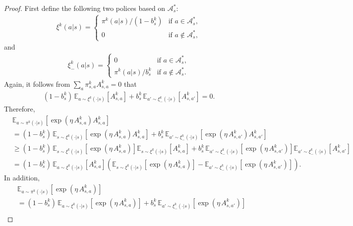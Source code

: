 \begin{proof}
    First define the following two polices based on $\mathcal{A}_s^*$:
\begin{align*}
\xi^k(a|s) =\begin{cases}
\pi^k(a|s)/(1-b_s^k)&\mbox{if }a\in\mathcal{A}_s^*,\\
0&\mbox{if }a\not\in\mathcal{A}_s^*,
\end{cases}
\end{align*}
and 
\begin{align*}
\xi^k_-(a|s) = \begin{cases}
0 & \mbox{if }a\in\mathcal{A}_s^*,\\
\pi^k(a|s)/b_s^k & \mbox{if }a\not\in\mathcal{A}_s^*.
\end{cases}
\end{align*}
Again, it follows from $\sum_a\pi^k_{s,a}A^k_{s,a}=0$ that
\begin{align*}
(1-b_s^k)\,\mathbb{E}_{a\sim \xi^k(\cdot|s)}\left[A^k_{s,a}\right]+b_s^k\,\mathbb{E}_{a'\sim\xi^k_-(\cdot|s)}\left[A^k_{s,a'}\right]=0.
\end{align*}
Therefore,
\begin{align*}
&\mathbb{E}_{a\sim \pi^k(\cdot|s)}\left[\exp\left(\eta\,A^k_{s,a}\right)A^k_{s,a}\right]\\
&=(1-b_s^k)\,\mathbb{E}_{s\sim\xi^k(\cdot|s)}\left[\exp\left(\eta\,A^k_{s,a}\right)A^k_{s,a}\right]+b_s^k\,\mathbb{E}_{a'\sim\xi^k_-(\cdot|s)}\left[\exp\left(\eta\,A^k_{s,a'}\right)A^k_{s,a'}\right]\\
&\geq (1-b_s^k)\,\mathbb{E}_{s\sim\xi^k(\cdot|s)}\left[\exp\left(\eta\,A^k_{s,a}\right)\right]\mathbb{E}_{s\sim\xi^k(\cdot|s)}\left[A^k_{s,a}\right]+b_s^k\,\mathbb{E}_{a'\sim\xi^k_-(\cdot|s)}\left[\exp\left(\eta\,A^k_{s,a'}\right)\right]\mathbb{E}_{a'\sim\xi^k_-(\cdot|s)}\left[A^k_{s,a'}\right]\\
&=(1-b_s^k)\,\mathbb{E}_{a\sim\xi^k(\cdot|s)}\left[A^k_{s,a}\right]\left(\mathbb{E}_{s\sim\xi^k(\cdot|s)}\left[\exp\left(\eta\,A^k_{s,a}\right)\right]-\mathbb{E}_{a'\sim\xi^k_-(\cdot|s)}\left[\exp\left(\eta\,A^k_{s,a'}\right)\right]\right).
\end{align*}
In addition,  
\begin{align*}
&\mathbb{E}_{a\sim\pi^k(\cdot|s)}\left[\exp\left(\eta\,A^k_{s,a}\right)\right]\\
&=(1-b_s^k)\,\mathbb{E}_{a\sim\xi^k(\cdot|s)}\left[\exp\left(\eta\,A^k_{s,a}\right)\right]+b_s^k\,\mathbb{E}_{a'\sim\xi^k_-(\cdot|s)}\left[\exp\left(\eta\,A^k_{s,a'}\right)\right]\\

\end{align*}
\end{proof}
